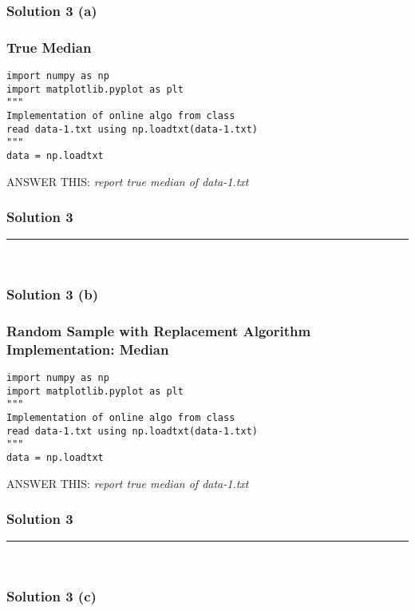 \documentclass{article}
\begin{document}
\subsubsection*{Solution 3 (a)}
\subsubsection*{True Median}

\begin{lstlisting}
import numpy as np
import matplotlib.pyplot as plt
"""
Implementation of online algo from class
read data-1.txt using np.loadtxt(data-1.txt)
"""
data = np.loadtxt
\end{lstlisting}

\parbox{\textwidth}{
ANSWER THIS: \textit{report true median of data-1.txt}
}

\newpage
\subsubsection*{Solution 3}
\noindent\rule{\textwidth}{0.4pt}\\
\subsubsection*{Solution 3 (b)}
\subsubsection*{Random Sample with Replacement Algorithm Implementation: Median}

\begin{lstlisting}
import numpy as np
import matplotlib.pyplot as plt
"""
Implementation of online algo from class
read data-1.txt using np.loadtxt(data-1.txt)
"""
data = np.loadtxt
\end{lstlisting}

\parbox{\textwidth}{
ANSWER THIS: \textit{report true median of data-1.txt}
}

\newpage
\subsubsection*{Solution 3}
\noindent\rule{\textwidth}{0.4pt}\\
\subsubsection*{Solution 3 (c)}
\end{document}
